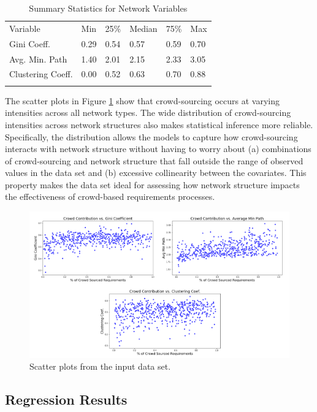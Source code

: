 \begin{table}
\caption{Summary Statistics for Network Variables}
\label{network_summary}
\begin{tabular}{llllll}
\hline\noalign{\smallskip}
Variable & Min & 25\% & Median & 75\% & Max  \\
\noalign{\smallskip}\hline\noalign{\smallskip}
Gini Coeff. & 0.29 & 0.54 & 0.57 & 0.59 & 0.70 \\
Avg. Min. Path & 1.40 & 2.01 & 2.15 & 2.33 & 3.05 \\
Clustering Coeff. & 0.00 & 0.52 & 0.63 & 0.70 & 0.88 \\
\noalign{\smallskip}\hline
\end{tabular}
\end{table}

The scatter plots in Figure \ref{network_structure_scatter} show that crowd-sourcing occurs at varying intensities across all network types. The wide distribution of crowd-sourcing intensities across network structures also makes statistical inference more reliable. Specifically, the distribution allows the models to capture how crowd-sourcing interacts with network structure without having to worry about (a) combinations of crowd-sourcing and network structure that fall outside the range of observed values in the data set and (b) excessive collinearity between the covariates. This property makes the data set ideal for assessing how network structure impacts the effectiveness of crowd-based requirements processes.

\begin{figure}
  \includegraphics[width=.95\textwidth]{network_structure_scatter.PNG}
\caption{Scatter plots from the input data set.}
\label{network_structure_scatter}
\end{figure}

\subsection{Regression Results}

